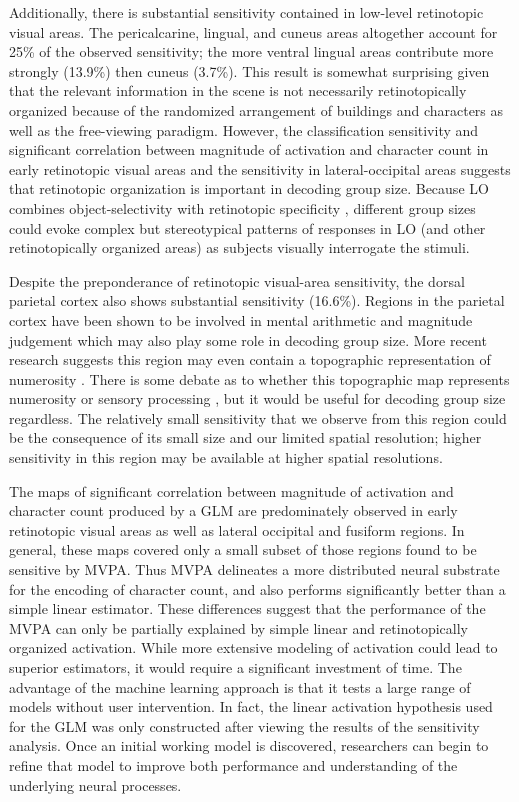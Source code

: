 \documentclass[5p,authoryear]{elsarticle}
\begin{document}
Additionally, there is substantial sensitivity contained in low-level retinotopic visual areas. 
The pericalcarine, lingual, and cuneus areas altogether account for 25\% of the observed sensitivity; the more ventral lingual areas contribute more strongly (13.9\%) then cuneus (3.7\%).
This result is somewhat surprising given that the relevant information in the scene is not necessarily retinotopically organized because of the randomized arrangement of buildings and characters as well as the free-viewing paradigm.
However, the classification sensitivity and significant correlation between magnitude of activation and character count in early retinotopic visual areas and the sensitivity in lateral-occipital areas suggests that retinotopic organization is important in decoding group size. 
Because LO combines object-selectivity with retinotopic specificity \citep{Sayres2008}, different group sizes could evoke complex but stereotypical patterns of responses in LO (and other retinotopically organized areas) as subjects visually interrogate the stimuli. 

Despite the preponderance of retinotopic visual-area sensitivity, the dorsal parietal cortex also shows substantial sensitivity (16.6\%).
Regions in the parietal cortex have been shown to be involved in mental arithmetic and magnitude judgement \citep{Rickard2000} which may also play some role in decoding group size.
More recent research suggests this region may even contain a topographic representation of numerosity \citep{Harvey2013}.
There is some debate as to whether this topographic map represents numerosity or sensory processing \citep{Gebuis2013}, but it would be useful for decoding group size regardless. 
The relatively small sensitivity that we observe from this region could be the consequence of its small size and our limited spatial resolution; higher sensitivity in this region may be available at higher spatial resolutions.

The maps of significant correlation between magnitude of activation and character count produced by a GLM are predominately observed in early retinotopic visual areas as well as lateral occipital and fusiform regions.
In general, these maps covered only a small subset of those regions found to be sensitive by MVPA.
Thus MVPA delineates a more distributed neural substrate for the encoding of character count, and also performs significantly better than a simple linear estimator.
These differences suggest that the performance of the MVPA can only be partially explained by simple linear and retinotopically organized activation.
While more extensive modeling of activation could lead to superior estimators, it would require a significant investment of time.
The advantage of the machine learning approach is that it tests a large range of models without user intervention.
In fact, the linear activation hypothesis used for the GLM was only constructed after viewing the results of the sensitivity analysis.
Once an initial working model is discovered, researchers can begin to refine that model to improve both performance and understanding of the underlying neural processes.
\end{document}
